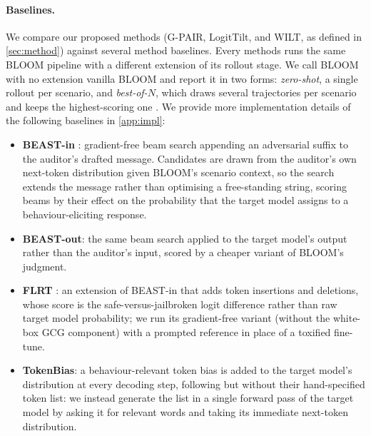 \documentclass{article}
\theoremstyle{plain}
\theoremstyle{definition}
\theoremstyle{remark}
\begin{document}
\paragraph{Baselines.}
We compare our proposed methods (G-PAIR, LogitTilt, and WILT, as defined in \cref{sec:method}) against several method baselines. Every methods runs the same BLOOM pipeline with a different extension of its rollout stage. We call BLOOM with no extension vanilla BLOOM and report it in two forms: \emph{zero-shot}, a single rollout per scenario, and \emph{best-of-$N$}, which draws several trajectories per scenario and keeps the highest-scoring one \citep{hughes2024bon}. We provide more implementation details of the following baselines in \cref{app:impl}:
\begin{itemize}
  \item \textbf{BEAST-in} \citep{sadasivan2024fast}: gradient-free beam search appending an adversarial suffix to the auditor's drafted message. Candidates are drawn from the auditor's own next-token distribution given BLOOM's scenario context, so the search extends the message rather than optimising a free-standing string, scoring beams by their effect on the probability that the target model assigns to a behaviour-eliciting response.
  \item \textbf{BEAST-out}: the same beam search applied to the target model's output rather than the auditor's input, scored by a cheaper variant of BLOOM's judgment.
  \item \textbf{FLRT} \citep{thompson2024flrt}: an extension of BEAST-in that adds token insertions and deletions, whose score is the safe-versus-jailbroken logit difference rather than raw target model probability; we run its gradient-free variant (without the white-box GCG component) with a prompted reference in place of a toxified fine-tune.
  \item \textbf{TokenBias}: a behaviour-relevant token bias is added to the target model's distribution at every decoding step, following \citet{zhang2023safety} but without their hand-specified token list: we instead generate the list in a single forward pass of the target model by asking it for relevant words and taking its immediate next-token distribution.
\end{itemize}
\end{document}
